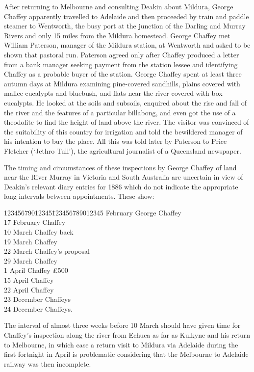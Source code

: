 After returning to Melbourne and consulting Deakin about Mildura,
George Chaffey apparently travelled to Adelaide and then proceeded by
train and paddle steamer to Wentworth, the busy port at the junction
of the Darling and Murray Rivers and only 15 miles from the Mildura
homestead.  George Chaffey met
William Paterson, manager of the Mildura station, at Wentworth and
asked to be shown that pastoral run.  Paterson agreed only after
Chaffey produced a letter from a bank manager seeking payment from the
station lessee and identifying Chaffey as a probable buyer of the
station.  George Chaffey spent at least three autumn days at Mildura
examining pine-covered sandhills, plains covered with mallee eucalypts
and bluebush, and flats near the river covered with box eucalypts.  He
looked at the soils and subsoils, enquired about the rise and fall of
the river and the features of a particular billabong, and even got the
use of a theodolite to find the height of land above the river.  The
visitor was convinced of the suitability of this country for
irrigation and told the bewildered manager of his intention to buy the
place.  All this was told later by Paterson to Price Fletcher (`Jethro
Tull'), the agricultural journalist of a Queensland
newspaper.

The timing and circumstances of these inspections by George Chaffey of
land near the River Murray in Victoria and South Australia are
uncertain in view of Deakin's relevant diary entries for 1886 which do
not indicate the appropriate long intervals between appointments.
These show:
\begin{tabbing}
        12345679012345\=123456789012345 February \> George Chaffey\\
	17 February \> Chaffey\\
	10 March    \> Chaffey back\\
	19 March    \> Chaffey \\
	22 March    \> Chaffey's proposal \\
	29 March    \> Chaffey \\
	 1 April    \> Chaffey \pounds500 \\
	15 April    \> Chaffey \\
	22 April    \> Chaffey \\
	23 December \> Chaffeys \\
	24 December \> Chaffeys.\\
\end{tabbing}
The interval of almost three weeks before 10 March should have given
time for Chaffey's inspection along the river from Echuca as far as
Kulkyne and his return to Melbourne, in which case a return visit to
Mildura via Adelaide during the first fortnight in April is
problematic considering that the Melbourne to Adelaide railway was
then incomplete.

